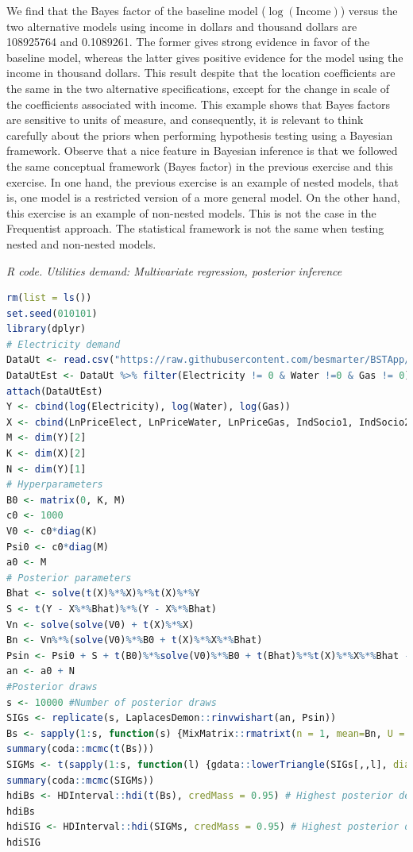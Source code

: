 \begin{enumerate}[leftmargin=*]
We find that the Bayes factor of the baseline model ($\log(\text{Income})$) versus the two alternative models using income in dollars and thousand dollars are 108925764 and 0.1089261. The former gives strong evidence in favor of the baseline model, whereas the latter gives positive evidence for the model using the income in thousand dollars. This result despite that the location coefficients are the same in the two alternative specifications, except for the change in scale of the coefficients associated with income. This example shows that Bayes factors are sensitive to units of measure, and consequently, it is relevant to think carefully about the priors when performing hypothesis testing using a Bayesian framework. Observe that a nice feature in Bayesian inference is that we followed the same conceptual framework (Bayes factor) in the previous exercise and this exercise. In one hand, the previous exercise is an example of nested models, that is, one model is a restricted version of a more general model. On the other hand, this exercise is an example of non-nested models. This is not the case in the Frequentist approach. The statistical framework is not the same when testing nested and non-nested models.

\begin{tcolorbox}[enhanced,width=4.67in,center upper,
	fontupper=\large\bfseries,drop shadow southwest,sharp corners]
	\textit{R code. Utilities demand: Multivariate regression, posterior inference}
	\begin{VF}
		\begin{lstlisting}[language=R]
rm(list = ls())
set.seed(010101)
library(dplyr)
# Electricity demand
DataUt <- read.csv("https://raw.githubusercontent.com/besmarter/BSTApp/refs/heads/master/DataApp/Utilities.csv", sep = ",", header = TRUE, quote = "")
DataUtEst <- DataUt %>% filter(Electricity != 0 & Water !=0 & Gas != 0)
attach(DataUtEst)
Y <- cbind(log(Electricity), log(Water), log(Gas))
X <- cbind(LnPriceElect, LnPriceWater, LnPriceGas, IndSocio1, IndSocio2, Altitude, Nrooms, HouseholdMem, Children, Lnincome, 1)
M <- dim(Y)[2]
K <- dim(X)[2]
N <- dim(Y)[1]
# Hyperparameters
B0 <- matrix(0, K, M)
c0 <- 1000
V0 <- c0*diag(K)
Psi0 <- c0*diag(M)
a0 <- M
# Posterior parameters
Bhat <- solve(t(X)%*%X)%*%t(X)%*%Y 
S <- t(Y - X%*%Bhat)%*%(Y - X%*%Bhat)
Vn <- solve(solve(V0) + t(X)%*%X) 
Bn <- Vn%*%(solve(V0)%*%B0 + t(X)%*%X%*%Bhat)
Psin <- Psi0 + S + t(B0)%*%solve(V0)%*%B0 + t(Bhat)%*%t(X)%*%X%*%Bhat - t(Bn)%*%solve(Vn)%*%Bn
an <- a0 + N
#Posterior draws
s <- 10000 #Number of posterior draws
SIGs <- replicate(s, LaplacesDemon::rinvwishart(an, Psin))
Bs <- sapply(1:s, function(s) {MixMatrix::rmatrixt(n = 1, mean=Bn, U = Vn,V = Psin, df = an + 1 - M)})
summary(coda::mcmc(t(Bs)))
SIGMs <- t(sapply(1:s, function(l) {gdata::lowerTriangle(SIGs[,,l], diag=TRUE, byrow=FALSE)}))
summary(coda::mcmc(SIGMs))
hdiBs <- HDInterval::hdi(t(Bs), credMass = 0.95) # Highest posterior density credible interval
hdiBs
hdiSIG <- HDInterval::hdi(SIGMs, credMass = 0.95) # Highest posterior density credible interval
hdiSIG
		\end{lstlisting}
	\end{VF}
\end{tcolorbox} 


\end{enumerate}
